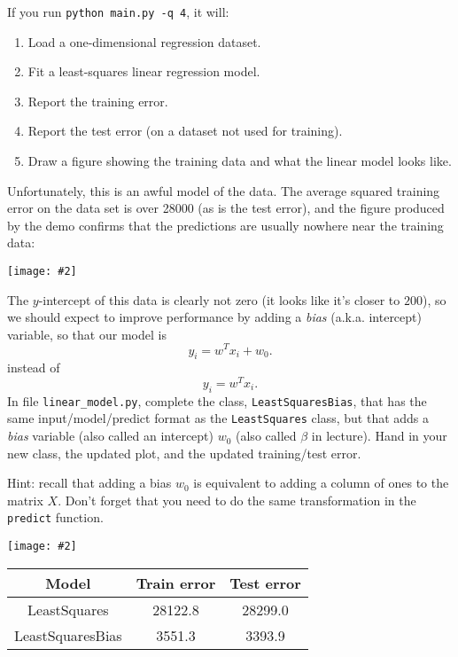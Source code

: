 \documentclass{article}
\def\blu#1{{\color{blu}#1}}
\def\ans#1{{\color{ans}#1}}
\newcommand{\centerfig}[2]{\begin{center}\texttt{[image: \#2]}\end{center}}
\def\enum#1{\begin{enumerate}#1\end{enumerate}}
\begin{document}
If you run  \verb|python main.py -q 4|, it will:
\enum{
\item Load a one-dimensional regression dataset.
\item Fit a least-squares linear regression model.
\item Report the training error.
\item Report the test error (on a dataset not used for training).
\item Draw a figure showing the training data and what the linear model looks like.
}
Unfortunately, this is an awful model of the data. The average squared training error on the data set is over 28000
(as is the test error), and the figure produced by the demo confirms that the predictions are usually nowhere near
 the training data:
\centerfig{.5}{../figs/least_squares_no_bias.pdf}
The $y$-intercept of this data is clearly not zero (it looks like it's closer to $200$),
so we should expect to improve performance by adding a \emph{bias} (a.k.a. intercept) variable, so that our model is
\[
y_i = w^Tx_i + w_0.
\]
instead of
\[
y_i = w^Tx_i.
\]
\blu{In file \texttt{linear\string_model.py}, complete the class, \texttt{LeastSquaresBias},
that has the same input/model/predict format as the \texttt{LeastSquares} class,
but that adds a \emph{bias} variable (also called an intercept) $w_0$ (also called $\beta$ in lecture). Hand in your new class, the updated plot,
and the updated training/test error.}

Hint: recall that adding a bias $w_0$ is equivalent to adding a column of ones to the matrix $X$. Don't forget that you need to do the same transformation in the \texttt{predict} function.

\begin{center}
    
\end{center}

\centerfig{1}{../figs/least_squares_bias.pdf}
\ans{
    \scriptsize
    \setlength{\tabcolsep}{10pt}
    \begin{center}
    \begin{tabular}{SSS} \toprule
        {Model} & {Train error} & {Test error} \\ \midrule
        {LeastSquares} & 28122.8 & 28299.0 \\ 
        {LeastSquaresBias} & 3551.3 & 3393.9 \\ \bottomrule
    \end{tabular}
    \end{center}
    \normalsize
}
\end{document}
